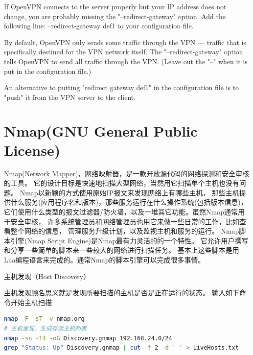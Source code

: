 \documentclass[12pt]{book}
\makeatletter
\numberwithin{dummy}{section}
\theoremstyle{ocrenumbox}
\theoremstyle{blacknumex}
\theoremstyle{blacknumbox}
\theoremstyle{ocrenum}
\renewcommand{\subsection}{\@startsection {subsection}{2}{\z@}
	{-3ex \@plus -0.1ex \@minus -.4ex}
	{0.5ex \@plus.2ex }
	{\normalfont\sffamily\bfseries}}
\makeatother
\begin{document}
If OpenVPN connects to the server properly but your IP address does not change, you are probably missing the "--redirect-gateway" option. Add the following line:
--redirect-gateway def1 to your configuration file.

By default, OpenVPN only sends some traffic through the VPN — traffic that is specifically destined for the VPN network itself. The "--redirect-gateway" option tells OpenVPN to send all traffic through the VPN. (Leave out the "--" when it is put in the configuration file.)

An alternative to putting "redirect gateway def1" in the configuration file is to "push" it from the VPN server to the client.

\chapter{Nmap(GNU General Public License)}

Nmap(Network Mapper)，网络映射器，是一款开放源代码的网络探测和安全审核的工具。
它的设计目标是快速地扫描大型网络，当然用它扫描单个主机也没有问题。
Nmap以新颖的方式使用原始IP报文来发现网络上有哪些主机，
那些主机提供什么服务(应用程序名和版本)，那些服务运行在什么操作系统(包括版本信息)，
它们使用什么类型的报文过滤器/防火墙，以及一堆其它功能。虽然Nmap通常用于安全审核，
许多系统管理员和网络管理员也用它来做一些日常的工作，比如查看整个网络的信息，
管理服务升级计划，以及监视主机和服务的运行。
Nmap脚本引擎(Nmap Script Engine)是Nmap最有力灵活的的一个特性。
它允许用户撰写和分享一些简单的脚本来一些较大的网络进行扫描任务。
基本上这些脚本是用Lua编程语言来完成的。通常Nmap的脚本引擎可以完成很多事情。

\subsection{主机发现（Host Discovery）}

主机发现顾名思义就是发现所要扫描的主机是否是正在运行的状态。
输入如下命令开始主机扫描

\begin{lstlisting}[language=Bash]
nmap -F -sT -v nmap.org
# 主机发现，生成存活主机列表
nmap -sn -T4 -oG Discovery.gnmap 192.168.24.0/24
grep "Status: Up" Discovery.gnmap | cut -f 2 -d ' ' > LiveHosts.txt
\end{lstlisting}
\end{document}
